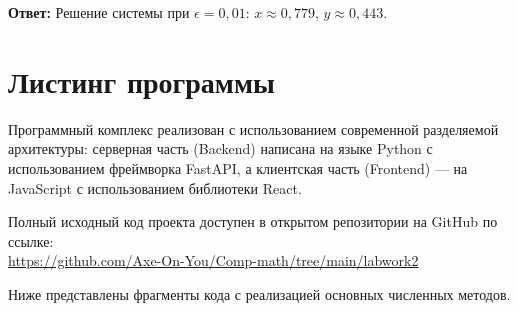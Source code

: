 \documentclass[a4paper,12pt]{article}
\begin{document}
\textbf{Ответ:} Решение системы при $\epsilon = 0,01$: $x \approx 0,779$, $y \approx 0,443$.

\newpage
\section{Листинг программы}
Программный комплекс реализован с использованием современной разделяемой архитектуры: серверная часть (Backend) написана на языке Python с использованием фреймворка FastAPI, а клиентская часть (Frontend) — на JavaScript с использованием библиотеки React.

Полный исходный код проекта доступен в открытом репозитории на GitHub по ссылке: \\
\url{https://github.com/Axe-On-You/Comp-math/tree/main/labwork2}

Ниже представлены фрагменты кода с реализацией основных численных методов.
\end{document}
